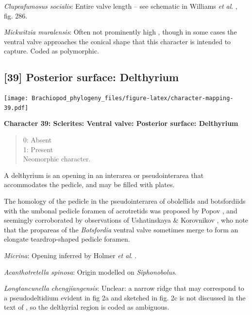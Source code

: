 \documentclass[openany]{book}
\theoremstyle{definition}
\theoremstyle{definition}
\theoremstyle{definition}
\theoremstyle{remark}
\begin{document}
\emph{Clupeafumosus socialis}: Entire valve length -- see schematic in
Williams \emph{et al}. \citeyearpar{Williams1997BrachiopodaRevised},
fig. 286.

\emph{Mickwitzia muralensis}: Often not prominently high
\citep{Skovsted2003EarlyCambrian, Balthasar2004Shellstructure}, though
in some cases \citep[e.g.][]{Butler2015Exceptionallypreserved} the
ventral valve approaches the conical shape that this character is
intended to capture. Coded as polymorphic.

\hypertarget{posterior-surface-delthyrium}{%
\subsection*{{[}39{]} Posterior surface:
Delthyrium}\label{posterior-surface-delthyrium}}

\texttt{[image: Brachiopod\_phylogeny\_files/figure-latex/character-mapping-39.pdf]}

\textbf{Character 39: Sclerites: Ventral valve: Posterior surface:
Delthyrium}

\begin{quote}
0: Absent\\
1: Present\\
Neomorphic character.
\end{quote}

A delthyrium is an opening in an interarea or pseudointerarea that
accommodates the pedicle, and may be filled with plates.

The homology of the pedicle in the pseudointerarea of obolellids and
botsfordiids with the umbonal pedicle foramen of acrotretids was
proposed by Popov \citeyearpar{Popov1992TheCambrian}, and seemingly
corroborated by observations of Ushatinskaya \& Korovnikov
\citeyearpar{Ushatinskaya2016Revisionof}, who note that the propareas of
the \emph{Botsfordia} ventral valve sometimes merge to form an elongate
teardrop-shaped pedicle foramen.

\emph{Micrina}: Opening inferred by Holmer \emph{et al}.
\citeyearpar{Holmer2008TheEarly}.

\emph{Acanthotretella spinosa}: Origin modelled on \emph{Siphonobolus}.

\emph{Longtancunella chengjiangensis}: Unclear: a narrow ridge that may
correspond to a pseudodeltidium evident in fig 2a and sketched in fig.
2c is not discussed in the text of \citet{Zhang2011Theexceptionally}, so
the delthyrial region is coded as ambiguous.
\end{document}
